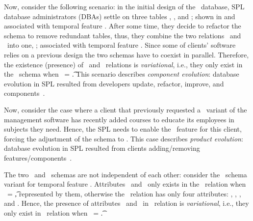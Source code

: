 Now, consider the following scenario:
in the initial design of the \basic\ database, SPL database administrators (DBAs)
settle on three tables \engemp, \othemp, and \job; shown in  and associated
with temporal feature \vOne. 
After some time, they decide
to refactor the schema to remove redundant tables,
thus, they combine the two
relations \engemp\ and \othemp\ into one, \empacct; associated with temporal feature \vTwo. 
Since some of clients' 
software relies on a previous design the two schemas have to coexist in parallel.
Therefore, the existence (presence) of \engemp\ and \othemp\
relations is \emph{variational}, i.e., they only exist in the \basic\
schema when \vOne\ = \t.
This scenario describes \emph{component evolution}:
database evolution in SPL resulted from developers
update, refactor, improve, and components~\cite{dbSPLevolve}.

Now, consider the case where a client that previously requested a \basic\ variant of the
management software has recently added courses to educate its
employees in subjects they need. Hence, the SPL needs to enable
the \edu\ feature for this client, forcing the adjustment of the schema to \educational. 
This case describes \emph{product evolution}:
database evolution in SPL resulted
from clients adding/removing features/components~\cite{dbSPLevolve}. 

The two \basic\ and \educational\ schemas are not independent of each other:
consider the \basic\ schema 
variant for temporal feature \vFour. Attributes \isstudent\ and \isteacher\ only exists
in the \empacct\ relation when \edu\ = \t, represented by  them,
otherwise the \empacct\
relation has only four attributes: \empno, \hiredate, \titleatt, and \deptno.
Hence, the presence of attributes \isstudent\ and \isteacher\ in \empacct\ relation is
\emph{variational}, i.e., they only exist in \empacct\ relation
when \edu\ = \t.

